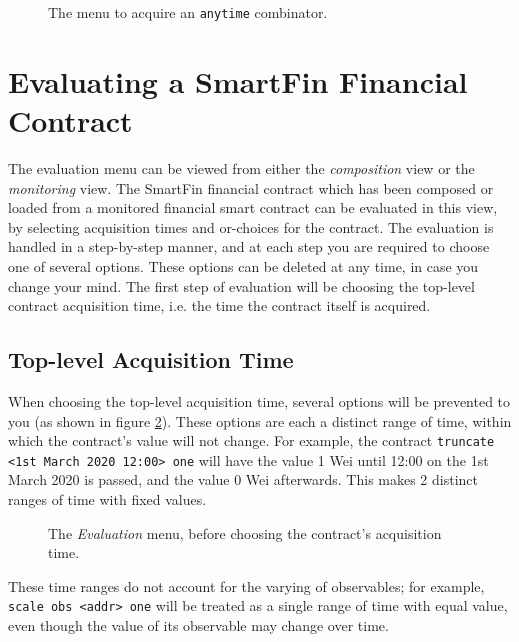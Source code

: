 \begin{figure}[h]
    \centering
    \caption{The menu to acquire an \texttt{anytime} combinator.}
    \label{UG:fig:monitoring-anytime-acquire}
\end{figure}


\section{Evaluating a SmartFin Financial Contract} \label{UG:evaluating}

The evaluation menu can be viewed from either the \textit{composition} view or the \textit{monitoring} view. The SmartFin financial contract which has been composed or loaded from a monitored financial smart contract can be evaluated in this view, by selecting acquisition times and or-choices for the contract. The evaluation is handled in a step-by-step manner, and at each step you are required to choose one of several options. These options can be deleted at any time, in case you change your mind. The first step of evaluation will be choosing the top-level contract acquisition time, i.e. the time the contract itself is acquired.


\subsection{Top-level Acquisition Time}

When choosing the top-level acquisition time, several options will be prevented to you (as shown in figure \ref{UG:fig:eval-time-unselected}). These options are each a distinct range of time, within which the contract's value will not change. For example, the contract \texttt{truncate <1st March 2020 12:00> one} will have the value 1 Wei until 12:00 on the 1st March 2020 is passed, and the value 0 Wei afterwards. This makes 2 distinct ranges of time with fixed values. \\

\begin{figure}[h]
    \centering
    \caption{The \textit{Evaluation} menu, before choosing the contract's acquisition time.}
    \label{UG:fig:eval-time-unselected}
\end{figure}

These time ranges do not account for the varying of observables; for example, \texttt{scale obs <addr> one} will be treated as a single range of time with equal value, even though the value of its observable may change over time.


